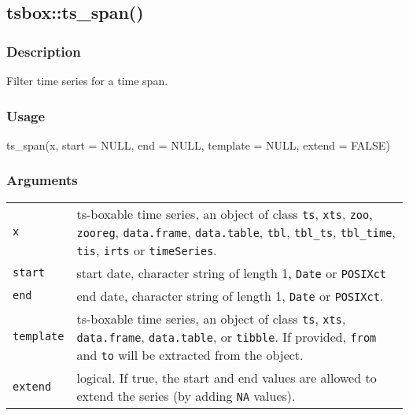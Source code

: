 \documentclass[
  letterpaper,
  DIV=11,
  numbers=noendperiod]{scrreport}
\newenvironment{Shaded}{\begin{snugshade}}{\end{snugshade}}
\newcommand{\AttributeTok}[1]{\textcolor[rgb]{0.40,0.45,0.13}{#1}}
\newcommand{\ConstantTok}[1]{\textcolor[rgb]{0.56,0.35,0.01}{#1}}
\newcommand{\FunctionTok}[1]{\textcolor[rgb]{0.28,0.35,0.67}{#1}}
\newcommand{\NormalTok}[1]{\textcolor[rgb]{0.00,0.23,0.31}{#1}}
\begin{document}
\subsection{tsbox::ts\_span()}\label{tsboxts_span}

\subsubsection{Description}\label{description-12}

Filter time series for a time span.

\subsubsection{Usage}\label{usage-12}

\begin{Shaded}
\begin{Highlighting}[]
\FunctionTok{ts\_span}\NormalTok{(x, }\AttributeTok{start =} \ConstantTok{NULL}\NormalTok{, }\AttributeTok{end =} \ConstantTok{NULL}\NormalTok{, }\AttributeTok{template =} \ConstantTok{NULL}\NormalTok{, }\AttributeTok{extend =} \ConstantTok{FALSE}\NormalTok{)}
\end{Highlighting}
\end{Shaded}

\subsubsection{Arguments}\label{arguments-12}

\begin{longtable}[]{@{}ll@{}}
\toprule\noalign{}
\endhead
\bottomrule\noalign{}
\endlastfoot
\texttt{x} & ts-boxable time series, an object of class \texttt{ts},
\texttt{xts}, \texttt{zoo}, \texttt{zooreg}, \texttt{data.frame},
\texttt{data.table}, \texttt{tbl}, \texttt{tbl\_ts}, \texttt{tbl\_time},
\texttt{tis}, \texttt{irts} or \texttt{timeSeries}. \\
\texttt{start} & start date, character string of length 1, \texttt{Date}
or \texttt{POSIXct} \\
\texttt{end} & end date, character string of length 1, \texttt{Date} or
\texttt{POSIXct}. \\
\texttt{template} & ts-boxable time series, an object of class
\texttt{ts}, \texttt{xts}, \texttt{data.frame}, \texttt{data.table}, or
\texttt{tibble}. If provided, \texttt{from} and \texttt{to} will be
extracted from the object. \\
\texttt{extend} & logical. If true, the start and end values are allowed
to extend the series (by adding \texttt{NA} values). \\
\end{longtable}
\end{document}
